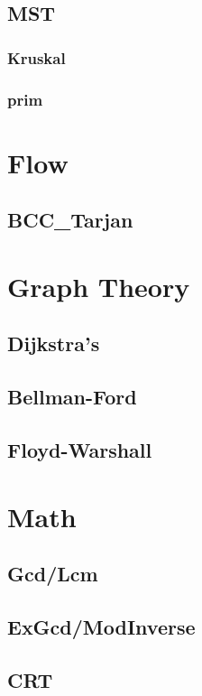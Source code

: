 	\subsection{MST}
        \subsubsection{Kruskal}
            
        \subsubsection{prim}
            
\section{Flow}
	\subsection{BCC_Tarjan}
		
\section{Graph Theory}
	\subsection{Dijkstra’s}
		
	\subsection{Bellman-Ford}
		
	\subsection{Floyd-Warshall}
		
\section{Math}
	\subsection{Gcd/Lcm}
		
	\subsection{ExGcd/ModInverse}
		
	\subsection{CRT}
		

